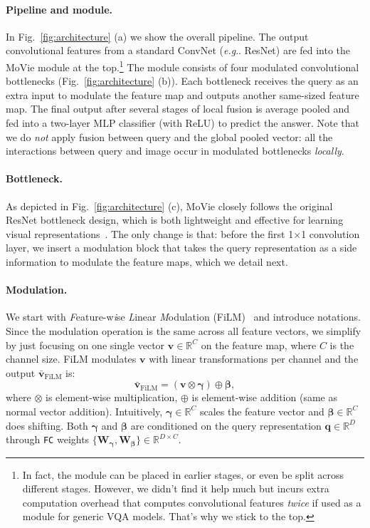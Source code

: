 \documentclass{article} \usepackage[dvipsnames,table]{xcolor}
\makeatletter
\def\rvq{{\mathbf{q}}}
\def\rvv{{\mathbf{v}}}
\def\rmW{{\mathbf{W}}}
\newcommand{\ours}[0]{MoVie\xspace}
\def\x{$\times$\xspace}
\newcommand{\bgamma}{\mathbf{\gamma}}
\newcommand{\bbeta}{\mathbf{\beta}}
\newcommand{\fc}{\texttt{FC}\xspace}
\DeclareRobustCommand\onedot{\futurelet\@let@token\@onedot}
\def\@onedot{\ifx\@let@token.\else.\null\fi\xspace}
\def\eg{\emph{e.g}\onedot} \def\Eg{\emph{E.g}\onedot}
\makeatother
\begin{document}
\paragraph{Pipeline and module.} In Fig.~\ref{fig:architecture} (a) we show the overall pipeline. The output convolutional features from a standard ConvNet (\eg ResNet) are fed into the \ours module at the top.\footnote{In fact, the module can be placed in earlier stages, or even be split across different stages. However, we didn't find it help much but incurs extra computation overhead that computes convolutional features \emph{twice} if used as a module for generic VQA models. That's why we stick to the top.} The module consists of four modulated convolutional bottlenecks (Fig.~\ref{fig:architecture} (b)). Each bottleneck receives the query as an extra input to modulate the feature map and outputs another same-sized feature map. The final output after several stages of local fusion is average pooled and fed into a two-layer MLP classifier (with ReLU) to predict the answer. Note that we do \emph{not} apply fusion between query and the global pooled vector: all the interactions between query and image occur in modulated bottlenecks \emph{locally}.

\paragraph{Bottleneck.} As depicted in Fig.~\ref{fig:architecture} (c), \ours closely follows the original ResNet bottleneck design, which is both lightweight and effective for learning visual representations~\cite{he2016deep}. The only change is that: before the first 1{\x}1 convolution layer, we insert a modulation block that takes the query representation as a side information to modulate the feature maps, which we detail next.

\paragraph{Modulation.} We start with \emph{F}eature-w\emph{i}se \emph{L}inear \emph{M}odulation (FiLM)~\cite{perez2018film} and introduce notations. Since the modulation operation is the same across all feature vectors, we simplify by just focusing on one single vector $\rvv{\in}\mathbb{R}^C$ on the feature map, where $C$ is the channel size. FiLM modulates $\rvv$ with linear transformations per channel and the output $\bar{\rvv}_\text{FiLM}$ is:
\begin{equation}\label{eqn:film}
    \bar{\rvv}_\text{FiLM} = (\rvv\otimes\bgamma)\oplus\bbeta,
\end{equation}
where $\otimes$ is element-wise multiplication, $\oplus$ is element-wise addition (same as normal vector addition). Intuitively, $\bgamma{\in}\mathbb{R}^C$ scales the feature vector and $\bbeta{\in}\mathbb{R}^C$ does shifting. Both $\bgamma$ and $\bbeta$ are conditioned on the query representation $\rvq{\in}\mathbb{R}^D$ through \fc weights $\{\rmW_{\bgamma},\rmW_{\bbeta}\}{\in}\mathbb{R}^{D{\times}C}$. 
\end{document}
